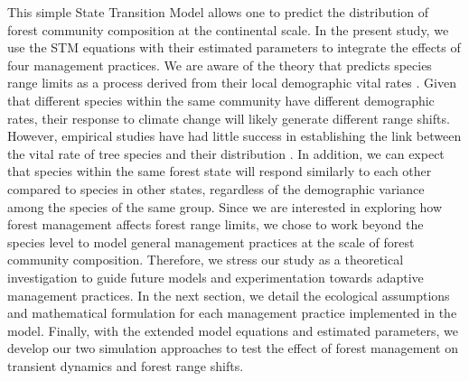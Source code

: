 This simple State Transition Model allows one to predict the
distribution of forest community composition at the continental scale.
In the present study, we use the STM equations with their estimated
parameters to integrate the effects of four management practices. We are
aware of the theory that predicts species range limits as a process
derived from their local demographic vital rates
\citep{Araujo2014a, Normand2014}. Given that different species within
the same community have different demographic rates, their response to
climate change will likely generate different range shifts. However,
empirical studies have had little success in establishing the link
between the vital rate of tree species and their distribution
\citep{LeSquin2021, Kunstler2021}. In addition, we can expect that
species within the same forest state will respond similarly to each
other compared to species in other states, regardless of the demographic
variance among the species of the same group. Since we are interested in
exploring how forest management affects forest range limits, we chose to
work beyond the species level to model general management practices at
the scale of forest community composition. Therefore, we stress our
study as a theoretical investigation to guide future models and
experimentation towards adaptive management practices. In the next
section, we detail the ecological assumptions and mathematical
formulation for each management practice implemented in the model.
Finally, with the extended model equations and estimated parameters, we
develop our two simulation approaches to test the effect of forest
management on transient dynamics and forest range shifts.\\

